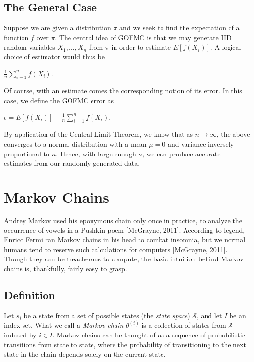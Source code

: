 \documentclass[12pt,twoside]{reedthesis}
\begin{document}
		\subsection*{The General Case}
			Suppose we are given a distribution $\pi$ and we seek to find the expectation of a function $f$ over $\pi$. The central idea of GOFMC is that we may generate IID random variables $X_1, \ldots, X_n$ from $\pi$ in order to estimate $E[f(X_i)]$. A logical choice of estimator would thus be
			\begin{center}
				$\displaystyle\frac{1}{n}\displaystyle\sum_{i=1}^{n}{f(X_i)}$.
			\end{center}		
			Of course, with an estimate comes the corresponding notion of its error. 
			In this case, we define the GOFMC error as
			\begin{center}
				$\epsilon = E[f(X_i)] - \displaystyle\frac{1}{n}\displaystyle\sum_{i=1}^{n}f(X_i)$.
			\end{center}
			By application of the Central Limit Theorem, we know that as $n \rightarrow \infty$, the above converges to a normal distribution with a mean $\mu = 0$ and variance inversely proportional to $n$.
			Hence, with large enough $n$, we can produce accurate estimates from our randomly generated data. 
	\section{Markov Chains}
	Andrey Markov used his eponymous chain only once in practice, to analyze the occurrence of vowels in a Pushkin poem [McGrayne, 2011]. According to legend, Enrico Fermi ran Markov chains in his head to combat insomnia, but we normal humans tend to reserve such calculations for computers [McGrayne, 2011]. Though they can be treacherous to compute, the basic intuition behind Markov chains is, thankfully, fairly easy to grasp.
	 
	 			\subsection*{Definition}
			Let $s_i$ be a state from a set of possible states (the {\em state space}) $\mathcal S$, and let $I$ be an index set. What we call a {\em Markov chain} $\theta^{(i)}$ is a collection of states from $\mathcal S$ indexed by $i \in I$. Markov chains can be thought of as a sequence of probabilistic transitions from state to state, where the probability of transitioning to the next state in the chain depends solely on the current state. 
			
\end{document}
